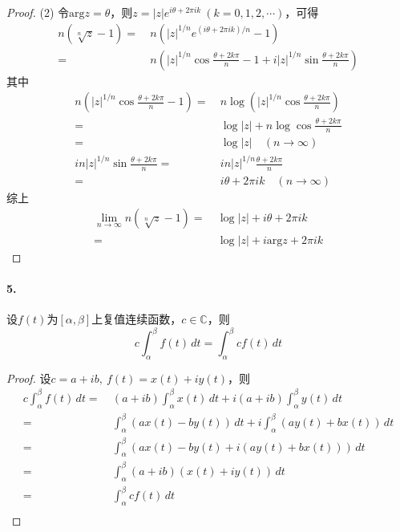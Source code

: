 \documentclass[12pt, a4paper, oneside]{ctexart}
\begin{document}
\begin{proof}
    (2) 令$\text{arg}z = \theta$，则$z = |z|e^{i\theta+2\pi ik}\ (k=0,1,2,\cdots)$，可得
    \begin{equation*}
        \begin{aligned}
            n(\sqrt[n]{z}-1) =&\ n(|z|^{1/n}e^{(i\theta+2\pi ik)/n}-1)\\
            =&\ n\left(|z|^{1/n}\cos\frac{\theta+2k\pi}{n}-1+i|z|^{1/n}\sin\frac{\theta+2k\pi}{n}\right)
        \end{aligned}
    \end{equation*}
    其中
    \begin{equation*}
        \begin{aligned}
            n\left(|z|^{1/n}\cos\frac{\theta+2k\pi}{n}-1\right) =&\ n\log\left(|z|^{1/n}\cos\frac{\theta+2k\pi}{n}\right)\\
            =&\ \log|z|+n\log\cos\frac{\theta+2k\pi}{n}\\
            =&\ \log|z|\quad(n\rightarrow\infty)\\
            i n|z|^{1/n}\sin\frac{\theta+2k\pi}{n}=&\ in|z|^{1/n}\frac{\theta+2k\pi}{n}\\
            =&\ i\theta+2\pi ik\quad (n\rightarrow\infty)
        \end{aligned}
    \end{equation*}
    综上
    \begin{equation*}
        \begin{aligned}
            \lim_{n\rightarrow\infty}n(\sqrt[n]{z}-1) =&\ \log|z|+ i\theta+2\pi ik\\
            =&\ \log|z|+ i\text{arg}z+2\pi ik
        \end{aligned}
    \end{equation*}
\end{proof}
\paragraph{5.}设$f(t)$为$[\alpha,\beta]$上复值连续函数，$c\in\mathbb{C}$，则
\begin{equation*}
    c\int_{\alpha}^\beta f(t)\,dt=\int_{\alpha}^\beta cf(t)\,dt
\end{equation*}
\begin{proof}
    设$c = a + ib,\ f(t) =x(t)+iy(t)$，则
    \begin{equation*}
        \begin{aligned}
            c\int_\alpha^\beta f(t)\,dt =&\ (a+ib)\int_\alpha^\beta x(t)\,dt+i(a+ib)\int_\alpha^\beta y(t)\,dt\\
            =&\ \int_\alpha^\beta (ax(t)-by(t))\,dt+i\int_\alpha^\beta (ay(t)+bx(t))\,dt\\
            =&\ \int_\alpha^\beta (ax(t)-by(t)+i (ay(t)+bx(t)))\,dt\\
            =&\ \int_\alpha^\beta(a+ib)(x(t)+iy(t))\,dt\\
            =&\ \int_\alpha^\beta cf(t)\,dt\\
        \end{aligned}
    \end{equation*}
\end{proof}
\end{document}

